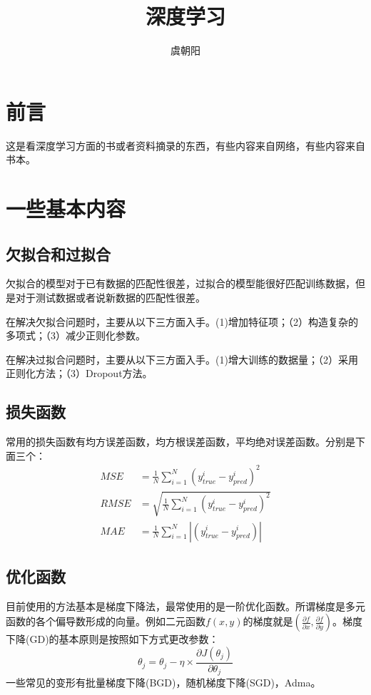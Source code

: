 \documentclass[12pt,a4paper,openany]{book}
\title{深度学习}
\author{虞朝阳}
\begin{document}
\frontmatter
\frontmatter
\begin{titlepage}
\maketitle
\end{titlepage}
\setcounter{page}{0}
\chapter{前言}
这是看深度学习方面的书或者资料摘录的东西，有些内容来自网络，有些内容来自书本。

\tableofcontents

\mainmatter
\chapter{一些基本内容}
\section{欠拟合和过拟合}
欠拟合的模型对于已有数据的匹配性很差，过拟合的模型能很好匹配训练数据，但是对于测试数据或者说新数据的匹配性很差。

在解决欠拟合问题时，主要从以下三方面入手。(1)增加特征项；（2）构造复杂的多项式；（3）减少正则化参数。

在解决过拟合问题时，主要从以下三方面入手。(1)增大训练的数据量；（2）采用正则化方法；（3）Dropout方法。

\section{损失函数}
常用的损失函数有均方误差函数，均方根误差函数，平均绝对误差函数。分别是下面三个：
\[
\begin{aligned}
MSE &= \frac{1}{N}\sum_{i=1}^{N}{(y_{true}^i - y_{pred}^i)^2} \\
RMSE &= \sqrt{\frac{1}{N}\sum_{i=1}^{N}{(y_{true}^i - y_{pred}^i)^2}} \\
MAE &= \frac{1}{N}\sum_{i=1}^{N}{|(y_{true}^i - y_{pred}^i)|}
\end{aligned}
\]


\section{优化函数}
目前使用的方法基本是梯度下降法，最常使用的是一阶优化函数。所谓梯度是多元函数的各个偏导数形成的向量。例如二元函数$f(x,y)$的梯度就是$(\frac{\partial{f}}{\partial{x}}, \frac{\partial{f}}{\partial{y}})$。梯度下降(GD)的基本原则是按照如下方式更改参数：
\[
\theta_j = \theta_j - \eta \times \frac{\partial{J(\theta_j)}}{\partial{\theta_j}}
\]
一些常见的变形有批量梯度下降(BGD)，随机梯度下降(SGD)，Adma。
\end{document}
